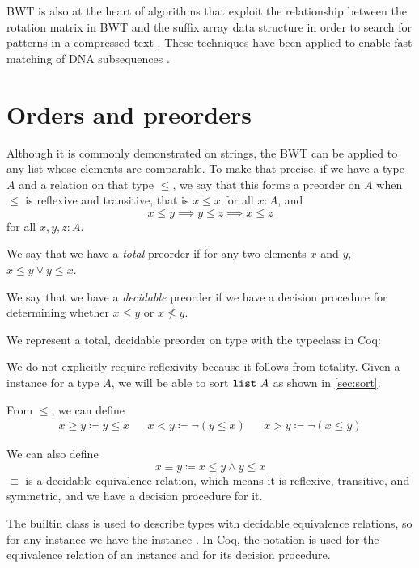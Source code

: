 \documentclass[sigplan,10pt,anonymous,review]{thesis}
\begin{document}
BWT is also at the heart of algorithms that exploit the relationship
between the rotation matrix in BWT and the suffix array data structure
in order to search for patterns in a compressed text
\cite{ferragina_index}. These techniques have been applied to enable
fast matching of DNA subsequences \cite{dna}.

\section{Orders and preorders}
\label{sec:ord}

Although it is commonly demonstrated on strings, the BWT can be
applied to any list whose elements are comparable. To make that
precise, if we have a type $A$ and a relation on that type $\le$, we say
that this forms a preorder on $A$ when $\le$ is reflexive and transitive, that is
$x \le x$ for all $x:A$, and
\begin{equation*}
  x \le y \implies y \le z \implies x \le z
\end{equation*}
for all $x,y,z:A$.

We say that we have a \textit{total} preorder if for any two elements
$x$ and $y$, $x \le y \lor y \le x$.

We say that we have a \textit{decidable} preorder if we have a
decision procedure for determining whether $x \le y$ or $x \not\le y$.

We represent a total, decidable preorder on type with the
 typeclass in Coq:

We do not explicitly require reflexivity because it follows from
totality. Given a  instance for a type $A$, we will be
able to sort $\texttt{list}~A$ as shown in \cref{sec:sort}.

From $\le$, we can define
\begin{align*}
x \ge y \coloneqq y \le x && x < y \coloneqq \lnot (y \le x) && x > y \coloneqq \lnot (x \le y)
\end{align*}

We can also define
\begin{equation*}
  x \equiv y \coloneqq x \le y \land y \le x
\end{equation*}
$\equiv$ is a
decidable equivalence relation, which means it is reflexive,
transitive, and symmetric, and we have a decision procedure for it.

The builtin class  is used to describe types with decidable
equivalence relations, so for any  instance we have the
 instance . In Coq, the notation
\var{=\hspace{0pt}=\hspace{0pt}=} is used for the equivalence relation of an 
instance and \var{=\hspace{0pt}=} for its decision procedure.
\end{document}
